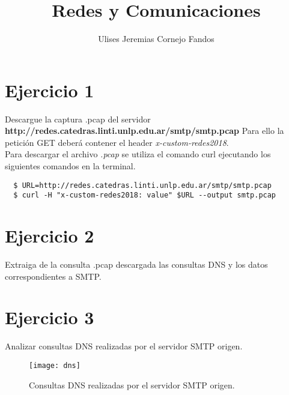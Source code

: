 \documentclass[osajnl,twocolumn,showpacs,superscriptaddress,10pt]{revtex4-1} %
\begin{document}
\title{Redes y Comunicaciones}

\author{Ulises Jeremias Cornejo Fandos}



\maketitle %

\onecolumngrid

\section{Ejercicio 1}

Descargue la captura .pcap del servidor \textbf{http://redes.catedras.linti.unlp.edu.ar/smtp/smtp.pcap} Para ello la petición GET deberá contener el header \textit{x-custom-redes2018}. \\

Para descargar el archivo \textit{.pcap} se utiliza el comando curl ejecutando los siguientes comandos en la terminal.

\begin{verbatim}
  $ URL=http://redes.catedras.linti.unlp.edu.ar/smtp/smtp.pcap
  $ curl -H "x-custom-redes2018: value" $URL --output smtp.pcap
\end{verbatim}

\section{Ejercicio 2}

Extraiga de la consulta .pcap descargada las consultas DNS y los datos correspondientes a SMTP. \\

\section{Ejercicio 3}

Analizar consultas DNS realizadas por el servidor SMTP origen.

\begin{figure}[H]
    \centering
    \texttt{[image: dns]}
    \caption{Consultas DNS realizadas por el servidor SMTP origen.}
\end{figure}
\end{document}
